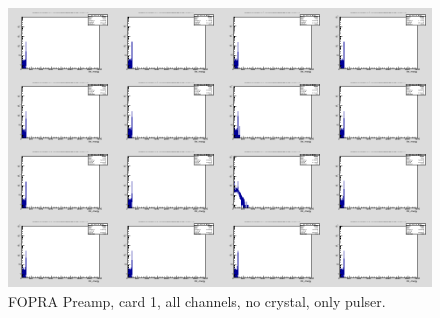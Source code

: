 \documentclass{report}
\begin{document}
\begin{figure}[!htb]
  \includegraphics[width=\linewidth]{fopra_preamp_lim_energy_card1_all.png}
  \caption{FOPRA Preamp, card 1, all channels, no crystal, only pulser.}
\end{figure}
\end{document}
